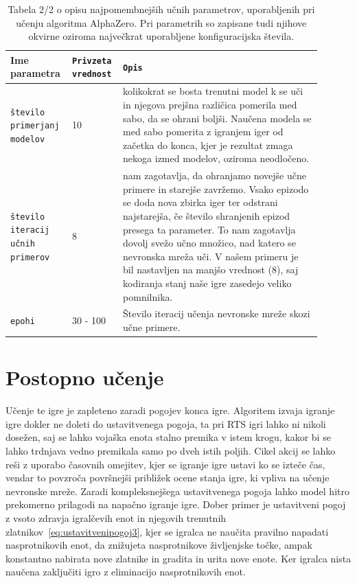 \documentclass[a4paper, 12pt]{book}
\begin{document}
\begin{table}
	\begin{center}
		\begin{tabular}{p{0.16\linewidth}|p{0.13\linewidth}|p{0.61\linewidth}}
			Ime parametra                             & {\tt Privzeta vrednost} & {\tt Opis} \\ \hline

			{\tt število primerjanj modelov}  		  & 10 						& kolikokrat se bosta trenutni model k se uči in njegova prejšna različica pomerila med sabo, da se ohrani boljši.
																				  Naučena modela se med sabo pomerita z igranjem iger od začetka do konca, kjer je rezultat zmaga nekoga izmed modelov, oziroma neodločeno.\\
			{\tt število iteracij učnih primerov}     & 8 						& nam zagotavlja, da ohranjamo novejše učne primere in starejše zavržemo.
																				  Vsako epizodo se doda nova zbirka iger ter odstrani najstarejša, če število shranjenih epizod presega ta parameter.
																				  To nam zagotavlja dovolj svežo učno množico, nad katero se nevronska mreža uči.
																				  V našem primeru je bil nastavljen na manjšo vrednost (8), saj kodiranja stanj naše igre zasedejo veliko pomnilnika.\\
			{\tt epohi}     						  & 30 - 100 					& Število iteracij učenja nevronske mreže skozi učne primere.\\
		\end{tabular}
	\end{center}
	\caption{Tabela 2/2 o opisu najpomembnejših učnih parametrov, uporabljenih pri učenju algoritma AlphaZero. Pri parametrih so zapisane tudi njihove okvirne oziroma največkrat uporabljene konfiguracijska števila.}
	\label{tableParameters2}
\end{table}

\section{Postopno učenje}
Učenje te igre je zapleteno zaradi pogojev konca igre. 
Algoritem izvaja igranje igre dokler ne doleti do ustavitvenega pogoja, ta pri RTS igri lahko ni nikoli dosežen, saj se lahko vojaška enota stalno premika v istem krogu, kakor bi se lahko trdnjava vedno premikala samo po dveh istih poljih.
Cikel akcij se lahko reši z uporabo časovnih omejitev, kjer se igranje igre ustavi ko se izteče čas, vendar to povzroča površnejši približek ocene stanja igre, ki vpliva na učenje nevronske mreže.
Zaradi kompleksnejšega ustavitvenega pogoja lahko model hitro prekomerno prilagodi na napačno igranje igre.
Dober primer je ustavitveni pogoj z vsoto zdravja igralčevih enot in njegovih trenutnih zlatnikov~\ref{eq:ustavitvenipogoj3}, kjer se igralca ne naučita pravilno napadati nasprotnikovih enot, da znižujeta nasprotnikove življenjske točke, ampak konstantno nabirata nove zlatnike in gradita in urita nove enote.
Ker igralca nista naučena zaključiti igro z eliminacijo nasprotnikovih enot.
\end{document}
